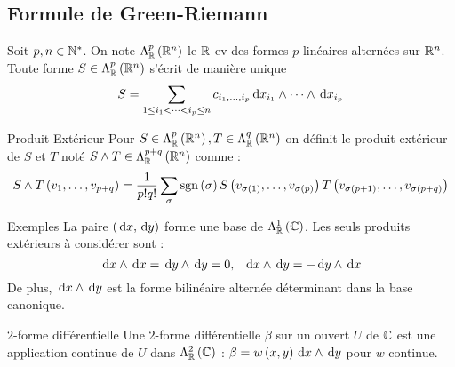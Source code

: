 \documentclass{cours}
\begin{document}
\subsection{Formule de Green-Riemann}
Soit $p, n \in \mathbb{N}^{*}$. On note $\Lambda_{\mathbb{R}}^{p}\left(\mathbb{R}^{n}\right)$ le $\mathbb{R}$-ev des formes $p$-linéaires alternées sur $\mathbb{R}^{n}$. Toute forme $S \in \Lambda_{\mathbb{R}}^{p}\left(\mathbb{R}^{n}\right)$ s'écrit de manière unique 
\begin{equation*}
    S = \sum_{1 \leq i_{1} < \cdots <i_{p} \leq n}c_{i_{1},\ldots, i_{p}}{\rm \, d} x_{i_{1}} \land \cdots \land {\rm \, d} x_{i_{p}}
\end{equation*}
\begin{définition}{Produit Extérieur}{}
    Pour $S \in \Lambda_{\mathbb{R}}^{p}\left(\mathbb{R}^{n}\right), T\in \Lambda_{\mathbb{R}}^{q}\left(\mathbb{R}^{n}\right)$ on définit le produit extérieur de $S$ et $T$ noté $S \land T \in \Lambda_{\mathbb{R}}^{p + q}\left(\mathbb{R}^{n}\right)$ comme : 
    \begin{equation*}
        S\land T\left(v_{1}, \ldots, v_{p + q}\right) = \frac{1}{p!q!}\sum_{\sigma}\operatorname{sgn}\left(\sigma\right)S\left(v_{\sigma\left(1\right)},\ldots, v_{\sigma\left(p\right)}\right)T\left(v_{\sigma\left(p + 1\right)}, \ldots, v_{\sigma\left(p + q\right)}\right)
    \end{equation*}
\end{définition}

\begin{propositionfr}{Exemples}{}
   La paire $\left({\rm \, d} x, {\rm \, d} y\right)$ forme une base de $\Lambda_{\mathbb{R}}^{1}\left(\mathbb{C}\right)$. Les seuls produits extérieurs à considérer sont : 
        \begin{equation*}
            {\rm \, d} x \land {\rm \, d} x = {\rm \, d} y \land {\rm \, d} y = 0, \ \ {\rm \, d} x \land {\rm \, d} y = -{\rm \, d} y \land {\rm \, d} x
        \end{equation*}
    De plus, ${\rm \, d} x \land {\rm \, d} y$ est la forme bilinéaire alternée déterminant dans la base canonique. 
\end{propositionfr}

\begin{définition}{$2$-forme différentielle}{}
    Une $2$-forme différentielle $\beta$ sur un ouvert $U$ de $\mathbb{C}$ est une application continue de $U$ dans $\Lambda_{\mathbb{R}}^{2}\left(\mathbb{C}\right)$ : $\beta = w\left(x, y\right){\rm \, d} x \land {\rm \, d} y$ pour $w$ continue. 
\end{définition}
\end{document}
